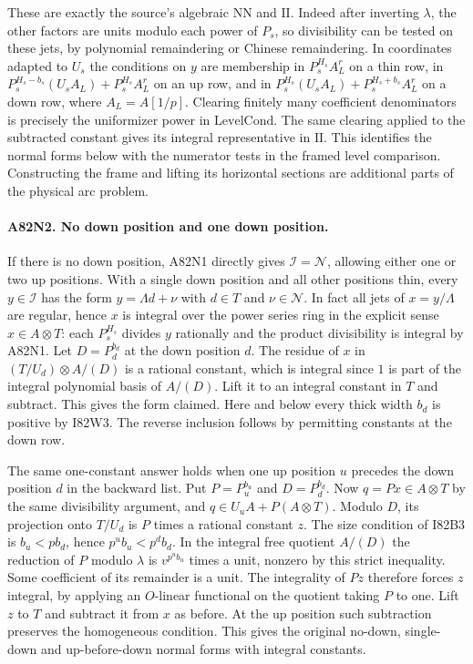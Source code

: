These are exactly the source's algebraic $\mathrm{NN}$ and
$\mathrm{II}$. Indeed after inverting $\lambda$, the other factors
are units modulo each power of $P_s$, so divisibility can be
tested on these jets, by polynomial remaindering or Chinese
remaindering. In coordinates adapted to $U_s$ the conditions
on $y$ are membership in $P_s^{H_s}A_L^r$ on a thin row, in
$P_s^{H_s-b_s}(U_sA_L)+P_s^{H_s}A_L^r$ on an up row,
and in $P_s^{H_s}(U_sA_L)+P_s^{H_s+b_s}A_L^r$ on a down
row, where $A_L=A[1/p]$. Clearing finitely many coefficient
denominators is precisely the uniformizer power in
$\mathrm{LevelCond}$. The same clearing applied to the subtracted
constant gives its integral representative in $\mathrm{II}$.
This identifies the normal forms below with the numerator tests
in the framed level comparison. Constructing the frame and lifting
its horizontal sections are additional parts of the physical arc
problem.

\paragraph{A82N2. No down position and one down position.}
If there is no down position, A82N1 directly gives
$\mathcal I=\mathcal N$, allowing either one or two up positions.
With a single down position and all other positions thin, every
$y\in\mathcal I$ has the form $y=\Lambda d+\nu$ with $d\in T$
and $\nu\in\mathcal N$. In fact all jets of $x=y/\Lambda$ are
regular, hence $x$ is integral over the power series ring in the
explicit sense $x\in A\otimes T$: each $P_s^{H_s}$ divides $y$
rationally and the product divisibility is integral by A82N1.
Let $D=P_d^{b_d}$ at the down position $d$. The residue of $x$
in $(T/U_d)\otimes A/(D)$ is a rational constant, which is
integral since $1$ is part of the integral polynomial basis of
$A/(D)$. Lift it to an integral constant in $T$ and subtract.
This gives the form claimed. Here and below every thick width
$b_d$ is positive by I82W3. The reverse inclusion follows by
permitting constants at the down row.

The same one-constant answer holds when one up position $u$
precedes the down position $d$ in the backward list. Put
$P=P_u^{b_u}$ and $D=P_d^{b_d}$. Now $q=Px\in A\otimes T$
by the same divisibility argument, and
$q\in U_u A+P(A\otimes T)$. Modulo $D$, its projection onto
$T/U_d$ is $P$ times a rational constant $z$. The size condition
of I82B3 is $b_u<pb_d$, hence $p^u b_u<p^d b_d$. In the
integral free quotient $A/(D)$ the reduction of $P$ modulo
$\lambda$ is $v^{p^u b_u}$ times a unit, nonzero by this
strict inequality. Some coefficient of its remainder is a unit.
The integrality of $Pz$ therefore forces $z$ integral, by
applying an $O$-linear functional on the quotient taking $P$
to one. Lift $z$ to $T$ and subtract it from $x$ as before.
At the up position such subtraction preserves the homogeneous
condition. This gives the original no-down, single-down and
up-before-down normal forms with integral constants.

